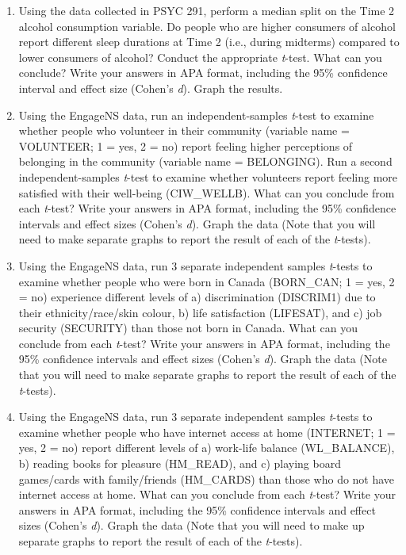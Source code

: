 \documentclass[
]{book}
\begin{document}
\begin{enumerate}
\def\labelenumi{\arabic{enumi}.}
\item
  Using the data collected in PSYC 291, perform a median split on the Time 2 alcohol consumption variable. Do people who are higher consumers of alcohol report different sleep durations at Time 2 (i.e., during midterms) compared to lower consumers of alcohol? Conduct the appropriate \emph{t}-test. What can you conclude? Write your answers in APA format, including the 95\% confidence interval and effect size (Cohen's \emph{d}). Graph the results.
\item
  Using the EngageNS data, run an independent-samples \emph{t}-test to examine whether people who volunteer in their community (variable name = VOLUNTEER; 1 = yes, 2 = no) report feeling higher perceptions of belonging in the community (variable name = BELONGING). Run a second independent-samples \emph{t}-test to examine whether volunteers report feeling more satisfied with their well-being (CIW\_WELLB). What can you conclude from each \emph{t}-test? Write your answers in APA format, including the 95\% confidence intervals and effect sizes (Cohen's \emph{d}). Graph the data (Note that you will need to make separate graphs to report the result of each of the \emph{t}-tests).
\item
  Using the EngageNS data, run 3 separate independent samples \emph{t}-tests to examine whether people who were born in Canada (BORN\_CAN; 1 = yes, 2 = no) experience different levels of a) discrimination (DISCRIM1) due to their ethnicity/race/skin colour, b) life satisfaction (LIFESAT), and c) job security (SECURITY) than those not born in Canada. What can you conclude from each \emph{t}-test? Write your answers in APA format, including the 95\% confidence intervals and effect sizes (Cohen's \emph{d}). Graph the data (Note that you will need to make separate graphs to report the result of each of the \emph{t}-tests).
\item
  Using the EngageNS data, run 3 separate independent samples \emph{t}-tests to examine whether people who have internet access at home (INTERNET; 1 = yes, 2 = no) report different levels of a) work-life balance (WL\_BALANCE), b) reading books for pleasure (HM\_READ), and c) playing board games/cards with family/friends (HM\_CARDS) than those who do not have internet access at home. What can you conclude from each \emph{t}-test? Write your answers in APA format, including the 95\% confidence intervals and effect sizes (Cohen's \emph{d}). Graph the data (Note that you will need to make up separate graphs to report the result of each of the \emph{t}-tests).
\end{enumerate}
\end{document}
